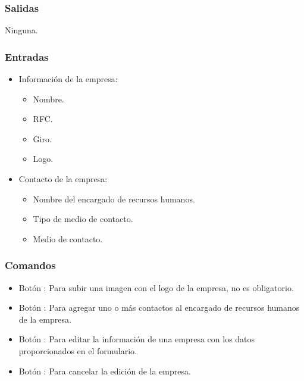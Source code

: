 \subsubsection{Salidas}
	\noindent
	Ninguna.

\subsubsection{Entradas}
	\begin{itemize}
		\item Información de la empresa:
		\begin{itemize}
			\item Nombre.
			\item RFC.
			\item Giro.
			\item Logo.
		\end{itemize}
		\item Contacto de la empresa:
		\begin{itemize}
			\item Nombre del encargado de recursos humanos.
			\item Tipo de medio de contacto. 
			\item Medio de contacto. 
		\end{itemize}

	\end{itemize}

\subsubsection{Comandos}
 	\begin{itemize}
 	\item Botón : Para subir una imagen con el logo de la empresa, no es obligatorio.  
		\item Botón \IUbutton{+}: Para agregar uno o más contactos al encargado de recursos humanos de la empresa.
		\item Botón : Para editar la información de una empresa con los datos proporcionados en el formulario.
		\item Botón : Para cancelar la edición de la empresa.

	\end{itemize}
	

